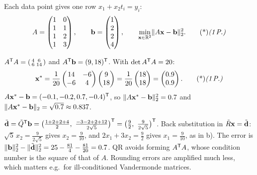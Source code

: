 \begin{solution}
 Each data point gives one row $x_1+x_2t_i=y_i$:
\[
A=\begin{pmatrix}1&0\\1&1\\1&2\\1&3\end{pmatrix},\qquad \vb b=\begin{pmatrix}1\\2\\2\\4\end{pmatrix},\qquad \min_{\vb x\in\R^2}\norm{A\vb x-\vb b}_2^2.\ptd{1}
\]

 $A^{\mathsf{T}} A=\begin{psmallmatrix}4&6\\6&14\end{psmallmatrix}$ and $A^{\mathsf{T}}\mathbf{b}=(9,18)^{\mathsf{T}}$. 
With $\det A^{\mathsf{T}} A=20$:
\[
\vb x^*=\frac1{20}\begin{pmatrix}14&-6\\-6&4\end{pmatrix}\begin{pmatrix}9\\18\end{pmatrix}=\frac1{20}\begin{pmatrix}18\\18\end{pmatrix}=\begin{pmatrix}0.9\\0.9\end{pmatrix}.\ptd{1}
\]
$A\mathbf{x}^*-\mathbf{b}=(-0.1,-0.2,0.7,-0.4)^{\mathsf{T}}$, so $\lVert A\mathbf{x}^*-\mathbf{b}\rVert_2^2=0.7$ and $\lVert A\mathbf{x}^*-\mathbf{b}\rVert_2=\sqrt{0.7}\approx0.837$. 

 $\tilde{\vb d}=\tilde Q\T\vb b=\big(\frac{1+2+2+4}2,\ \frac{-3-2+2+12}{2\sqrt5}\big)\T=\big(\frac92,\ \frac9{2\sqrt5}\big)\T$. 
Back substitution in $\tilde R\mathbf{x}=\tilde{\mathbf{d}}$: $\sqrt5\,x_2=\frac9{2\sqrt5}$ gives $x_2=\frac9{10}$, and $2x_1+3x_2=\frac92$ gives $x_1=\frac9{10}$, as in b). The error is $\lVert \mathbf{b}\rVert_2^2-\lVert \tilde{\mathbf{d}}\rVert_2^2=25-\frac{81}4-\frac{81}{20}=0.7$. 
QR avoids forming $A^{\mathsf{T}} A$, whose condition number is the square of that of $A$. Rounding errors are amplified much less, which matters e.g.\ for ill-conditioned Vandermonde matrices. 


\end{solution}
